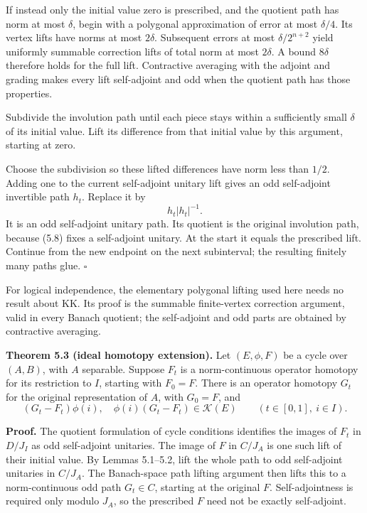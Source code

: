 \documentclass[
  11pt,
]{article}
\begin{document}
If instead only the initial value zero is prescribed, and the quotient
path has norm at most \(\delta\), begin with a polygonal approximation
of error at most \(\delta/4\). Its vertex lifts have norms at most
\(2\delta\). Subsequent errors at most \(\delta/2^{n+2}\) yield
uniformly summable correction lifts of total norm at most \(2\delta\). A
bound \(8\delta\) therefore holds for the full lift. Contractive
averaging with the adjoint and grading makes every lift self-adjoint and
odd when the quotient path has those properties.

Subdivide the involution path until each piece stays within a
sufficiently small \(\delta\) of its initial value. Lift its difference
from that initial value by this argument, starting at zero.

Choose the subdivision so these lifted differences have norm less than
\(1/2\). Adding one to the current self-adjoint unitary lift gives an
odd self-adjoint invertible path \(h_t\). Replace it by \[
h_t|h_t|^{-1}.
\tag{5.8}
\] It is an odd self-adjoint unitary path. Its quotient is the original
involution path, because (5.8) fixes a self-adjoint unitary. At the
start it equals the prescribed lift. Continue from the new endpoint on
the next subinterval; the resulting finitely many paths glue.
\(\square\)

For logical independence, the elementary polygonal lifting used here
needs no result about KK. Its proof is the summable finite-vertex
correction argument, valid in every Banach quotient; the self-adjoint
and odd parts are obtained by contractive averaging.

\textbf{Theorem 5.3 (ideal homotopy extension).} Let \((E,\phi,F)\) be a
cycle over \((A,B)\), with \(A\) separable. Suppose \(F_t\) is a
norm-continuous operator homotopy for its restriction to \(I\), starting
with \(F_0=F\). There is an operator homotopy \(G_t\) for the original
representation of \(A\), with \(G_0=F\), and \[
(G_t-F_t)\phi(i),\quad\phi(i)(G_t-F_t)\in\mathcal K(E)
\qquad(t\in[0,1],\ i\in I).
\tag{5.9}
\]

\textbf{Proof.} The quotient formulation of cycle conditions identifies
the images of \(F_t\) in \(D/J_I\) as odd self-adjoint unitaries. The
image of \(F\) in \(C/J_A\) is one such lift of their initial value. By
Lemmas 5.1--5.2, lift the whole path to odd self-adjoint unitaries in
\(C/J_A\). The Banach-space path lifting argument then lifts this to a
norm-continuous odd path \(G_t\in C\), starting at the original \(F\).
Self-adjointness is required only modulo \(J_A\), so the prescribed
\(F\) need not be exactly self-adjoint.
\end{document}
